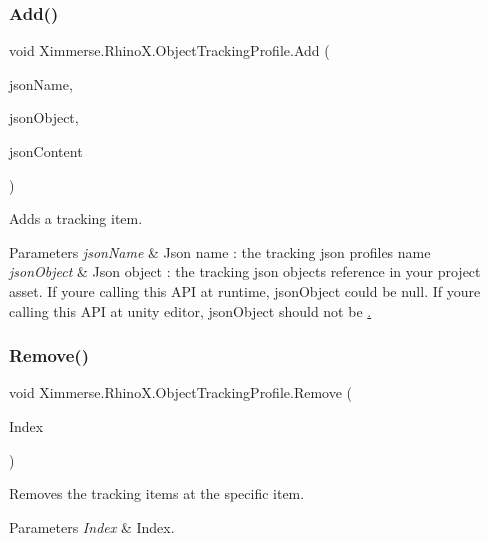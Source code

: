 \subsubsection{\texorpdfstring{Add()}{Add()}}
{\footnotesize\ttfamily void Ximmerse.\+Rhino\+X.\+Object\+Tracking\+Profile.\+Add (\begin{DoxyParamCaption}\item[{string}]{json\+Name,  }\item[{Unity\+Engine.\+Object}]{json\+Object,  }\item[{string}]{json\+Content }\end{DoxyParamCaption})}



Adds a tracking item. 


\begin{DoxyParams}{Parameters}
{\em json\+Name} & Json name \+: the tracking json profile\textquotesingle{}s name\\
\hline
{\em json\+Object} & Json object \+: the tracking json object\textquotesingle{}s reference in your project asset. If you\textquotesingle{}re calling this A\+PI at runtime, json\+Object could be null. If you\textquotesingle{}re calling this A\+PI at unity editor, json\+Object should not be \mbox{\hyperlink{}{.}} \\
\hline
\end{DoxyParams}
\mbox{\label{class_ximmerse_1_1_rhino_x_1_1_object_tracking_profile_a7096567a6cc3599254f38f73aebc3b09}} 
\subsubsection{\texorpdfstring{Remove()}{Remove()}}
{\footnotesize\ttfamily void Ximmerse.\+Rhino\+X.\+Object\+Tracking\+Profile.\+Remove (\begin{DoxyParamCaption}\item[{int}]{Index }\end{DoxyParamCaption})}



Removes the tracking items at the specific item. 


\begin{DoxyParams}{Parameters}
{\em Index} & Index.\\
\hline
\end{DoxyParams}


